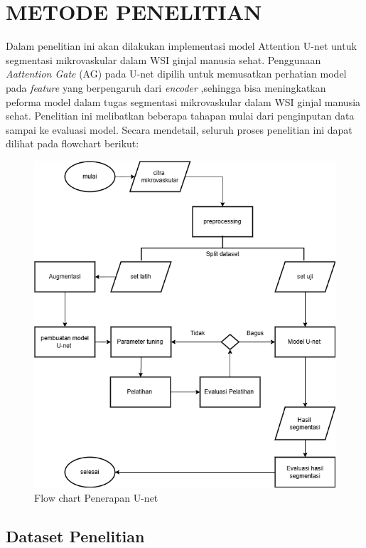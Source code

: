\chapter{METODE PENELITIAN}
\label{sec:metode-penelitian}

\noindent Dalam penelitian ini akan dilakukan implementasi model Attention U-net untuk segmentasi mikrovaskular dalam WSI ginjal manusia sehat.  Penggunaan \textit{Aattention Gate} (AG) pada U-net dipilih untuk memusatkan perhatian model pada \textit{feature} yang berpengaruh dari \textit{encoder} ,sehingga bisa meningkatkan peforma model dalam tugas segmentasi mikrovaskular dalam WSI ginjal manusia sehat. Penelitian ini melibatkan beberapa tahapan mulai dari penginputan data sampai ke evaluasi model. Secara mendetail, seluruh proses penelitian ini dapat dilihat pada flowchart berikut:
\begin{figure}[H]
	\centering
	\includegraphics[scale=.6]{gambar/flow-chart.png}
	\caption{Flow chart Penerapan U-net}
	\label{fig:flow-chart}
\end{figure}

\section{Dataset Penelitian}

